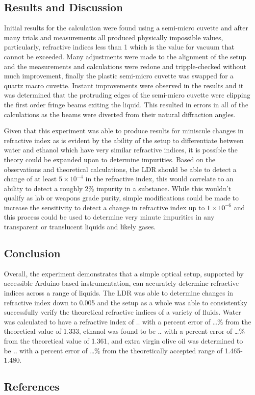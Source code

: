 \documentclass[11pt]{article}
\begin{document}
    \hypertarget{results-and-discussion}{%
\subsection{Results and Discussion}\label{results-and-discussion}}

    Initial results for the calculation were found using a semi-micro
cuvette and after many trials and measurements all produced physically
impossible values, particularly, refractive indices less than 1 which is
the value for vacuum that cannot be exceeded. Many adjustments were made
to the alignment of the setup and the measurements and calculations were
redone and tripple-checked without much improvement, finally the plastic
semi-micro cuvette was swapped for a quartz macro cuvette. Instant
improvements were observed in the results and it was determined that the
protruding edges of the semi-micro cuvette were clipping the first order
fringe beams exiting the liquid. This resulted in errors in all of the
calculations as the beams were diverted from their natural diffraction
angles.

Given that this experiment was able to produce results for miniscule
changes in refractive index as is evident by the ability of the setup to
differentiate between water and ethanol which have very similar
refractive indices, it is possible the theory could be expanded upon to
determine impurities. Based on the observations and theoretical
calculations, the LDR should be able to detect a change of at least
\(5 \times 10^{-4}\) in the refractive index, this would correlate to an
ability to detect a roughly 2\% impurity in a substance. While this
wouldn't qualify as lab or weapons grade purity, simple modifications
could be made to increase the sensitivity to detect a change in
refractive index up to \(1 \times 10^{-6}\) and this process could be
used to determine very minute impurities in any transparent or
translucent liquids and likely gases.

    \hypertarget{conclusion}{%
\subsection{Conclusion}\label{conclusion}}

    Overall, the experiment demonstrates that a simple optical setup,
supported by accessible Arduino-based instrumentation, can accurately
determine refractive indices across a range of liquids. The LDR was able
to determine changes in refractive index down to 0.005 and the setup as
a whole was able to consistentky successfully verify the theoretical
refractive indices of a variety of fluids. Water was calculated to have
a refractive index of .. with a percent error of \ldots\% from the
theoretical value of 1.333, ethanol was found to be .. with a percent
error of \ldots\% from the theoretical value of 1.361, and extra virgin
olive oil was determined to be .. with a percent error of \ldots\% from
the theoretically accepted range of 1.465-1.480.

    \hypertarget{references}{%
\subsection{References}\label{references}}


    
    
    
\end{document}
